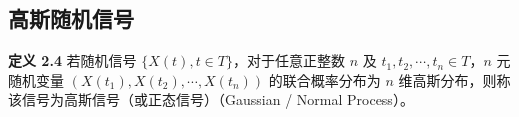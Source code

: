 \documentclass[11pt,openany,UTF8]{ctexbook}
\newcommand{\thm}[1]{\par\medskip\noindent\textbf{#1}\quad}
\begin{document}


\subsection{高斯随机信号}

\thm{定义 2.4} 若随机信号 $\{X(t),t\in T\}$\nobreak，对于任意正整数 $n$ 及 $t_1,t_2,\cdots,t_n\in T$\nobreak，$n$ 元随机变量 $(X(t_1),X(t_2),\cdots,X(t_n))$ 的联合概率分布为 $n$ 维高斯分布\nobreak，则称该信号为高斯信号（或正态信号\nobreak）（Gaussian / Normal Process\nobreak）\nobreak。
\end{document}
